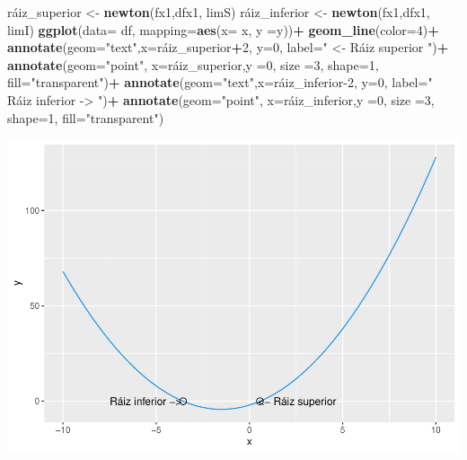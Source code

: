 \documentclass[11pt,]{article}
\newenvironment{Shaded}{\begin{snugshade}}{\end{snugshade}}
\newcommand{\DataTypeTok}[1]{\textcolor[rgb]{0.13,0.29,0.53}{#1}}
\newcommand{\DecValTok}[1]{\textcolor[rgb]{0.00,0.00,0.81}{#1}}
\newcommand{\KeywordTok}[1]{\textcolor[rgb]{0.13,0.29,0.53}{\textbf{#1}}}
\newcommand{\NormalTok}[1]{#1}
\newcommand{\OperatorTok}[1]{\textcolor[rgb]{0.81,0.36,0.00}{\textbf{#1}}}
\newcommand{\StringTok}[1]{\textcolor[rgb]{0.31,0.60,0.02}{#1}}
\begin{document}
\begin{Shaded}
\begin{Highlighting}[]
\NormalTok{ráiz_superior <-}\StringTok{ }\KeywordTok{newton}\NormalTok{(fx1,dfx1, limS)}
\NormalTok{ráiz_inferior <-}\StringTok{ }\KeywordTok{newton}\NormalTok{(fx1,dfx1, limI)}
\KeywordTok{ggplot}\NormalTok{(}\DataTypeTok{data=}\NormalTok{ df, }\DataTypeTok{mapping=}\KeywordTok{aes}\NormalTok{(}\DataTypeTok{x=}\NormalTok{ x, }\DataTypeTok{y =}\NormalTok{y))}\OperatorTok{+}
\StringTok{  }\KeywordTok{geom_line}\NormalTok{(}\DataTypeTok{color=}\DecValTok{4}\NormalTok{)}\OperatorTok{+}
\StringTok{  }\KeywordTok{annotate}\NormalTok{(}\DataTypeTok{geom=}\StringTok{"text"}\NormalTok{,}\DataTypeTok{x=}\NormalTok{ráiz_superior}\OperatorTok{+}\DecValTok{2}\NormalTok{, }\DataTypeTok{y=}\DecValTok{0}\NormalTok{, }\DataTypeTok{label=}\StringTok{" <- Ráiz superior "}\NormalTok{)}\OperatorTok{+}
\StringTok{  }\KeywordTok{annotate}\NormalTok{(}\DataTypeTok{geom=}\StringTok{"point"}\NormalTok{, }\DataTypeTok{x=}\NormalTok{ráiz_superior,}\DataTypeTok{y =}\DecValTok{0}\NormalTok{, }\DataTypeTok{size =}\DecValTok{3}\NormalTok{, }\DataTypeTok{shape=}\DecValTok{1}\NormalTok{, }\DataTypeTok{fill=}\StringTok{"transparent"}\NormalTok{)}\OperatorTok{+}
\StringTok{  }\KeywordTok{annotate}\NormalTok{(}\DataTypeTok{geom=}\StringTok{"text"}\NormalTok{,}\DataTypeTok{x=}\NormalTok{ráiz_inferior}\DecValTok{-2}\NormalTok{, }\DataTypeTok{y=}\DecValTok{0}\NormalTok{, }\DataTypeTok{label=}\StringTok{" Ráiz inferior -> "}\NormalTok{)}\OperatorTok{+}
\StringTok{  }\KeywordTok{annotate}\NormalTok{(}\DataTypeTok{geom=}\StringTok{"point"}\NormalTok{, }\DataTypeTok{x=}\NormalTok{ráiz_inferior,}\DataTypeTok{y =}\DecValTok{0}\NormalTok{, }\DataTypeTok{size =}\DecValTok{3}\NormalTok{, }\DataTypeTok{shape=}\DecValTok{1}\NormalTok{, }\DataTypeTok{fill=}\StringTok{"transparent"}\NormalTok{)}
\end{Highlighting}
\end{Shaded}

\includegraphics{Newton_raphson_files/figure-latex/unnamed-chunk-5-1.pdf}

\newpage
\singlespacing 
\end{document}
